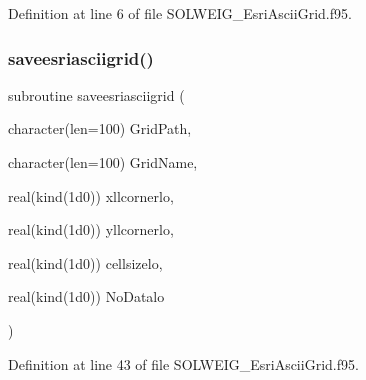 Definition at line 6 of file S\+O\+L\+W\+E\+I\+G\+\_\+\+Esri\+Ascii\+Grid.\+f95.

\mbox{\label{_s_o_l_w_e_i_g___esri_ascii_grid_8f95_a3489cd5023a70f0232cc533e6daa3884}} 
\subsubsection{\texorpdfstring{saveesriasciigrid()}{saveesriasciigrid()}}
{\footnotesize\ttfamily subroutine saveesriasciigrid (\begin{DoxyParamCaption}\item[{character(len=100)}]{Grid\+Path,  }\item[{character(len=100)}]{Grid\+Name,  }\item[{real(kind(1d0))}]{xllcornerlo,  }\item[{real(kind(1d0))}]{yllcornerlo,  }\item[{real(kind(1d0))}]{cellsizelo,  }\item[{real(kind(1d0))}]{No\+Datalo }\end{DoxyParamCaption})}



Definition at line 43 of file S\+O\+L\+W\+E\+I\+G\+\_\+\+Esri\+Ascii\+Grid.\+f95.

